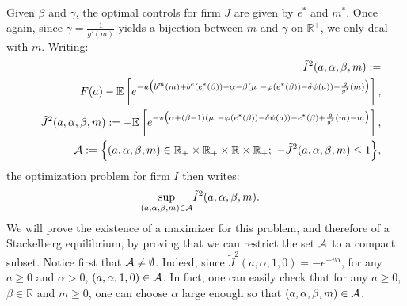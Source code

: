 \documentclass{svjour3}
\begin{document}
\\
Given $\beta$ and $\gamma$, the optimal controls for firm $J$ are given by $e^*$ and $m^*$. 
 Once again, since   $\gamma=\frac{1}{g'(m)}$  yields a bijection between
$m$ and $\gamma$ on $\mathbb{R}^+$,  we only deal with $m.$
Writing:
 \begin{eqnarray*}
 &&\tilde I^2(a,\alpha,\beta,m):=
 \\
 &&F(a)- \mathbb{E}\left[e^{-u\big(b^m(m)+b^e(e^*(\beta))-\alpha-\beta(\mu~-\varphi(e^*(\beta))-\delta \psi(a))-
 \frac{ g}{g'}(m)\big)}\right],
 \\
 &&\tilde J^2(a,\alpha,\beta,m):=
 -\mathbb{E}\left[e^{-v\big(\alpha+
 (\beta-1)(\mu~-\varphi(e^*(\beta))-\delta\psi(a))-e^*(\beta)+
 \frac{g}{g'}(m)-m\big)}\right],
 \\
& &{\cal A}:=\Big\{(a,\alpha,\beta,m)\in\mathbb{R}_+\times\mathbb{R}_+\times\mathbb{R}\times\mathbb{R}_+;~-\tilde J^2(a,\alpha,\beta,m)\leq 1\Big\},
 \end{eqnarray*}
 the optimization problem for firm $I$ then writes:
\begin{eqnarray*}
\sup_{(a,\alpha,\beta,m)\in{\cal A}}&\tilde I^2(a,\alpha,\beta,m).
\end{eqnarray*}
We will prove the existence of a maximizer for this problem, and therefore of a Stackelberg equilibrium, by proving that we can restrict the set ${\cal A}$ to a compact subset. Notice first that ${\cal A}\neq\emptyset$. Indeed,  since
 $\tilde J^2(a,\alpha,1,0)=-e^{-v\alpha}$,  for any $a\geq 0$ and $\alpha>0$, $(a,\alpha,1,0)\in{\cal A}$. In fact, one can easily check that for any $a\geq 0$, $\beta\in\mathbb{R}$ and $m\geq 0$, one can choose $\alpha$ large enough so that $(a,\alpha,\beta,m)\in{\cal A}$.
\\
\end{document}

